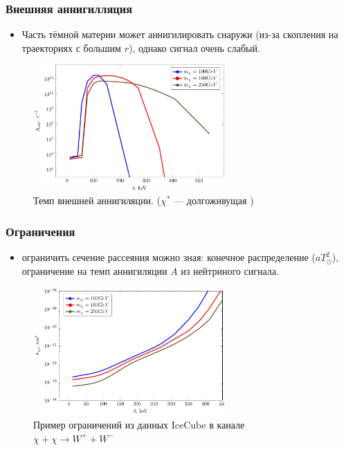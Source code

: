 \documentclass[
11pt,]{beamer}
\begin{document}
	\begin{frame}
		\frametitle{Внешняя аннигилляция}
		\begin{itemize}
	\item Часть тёмной материи может аннигилировать снаружи (из-за скопления на траекториях с большим $r$), однако сигнал очень слабый.
\end{itemize}

\begin{figure}[!h]
	\centering
	\includegraphics[width=0.65\textwidth]{images/Aout.png}
	\caption{Темп внешней аннигиляции. ($\chi^*$ --- долгоживущая )}
\end{figure}
	\end{frame}
	
	\begin{frame}
		\frametitle{Ограничения}
		\begin{itemize}
	\item ограничить сечение рассеяния можно зная: конечное распределение ($aT_{\odot}^2$), ограничение на темп аннигиляции  $A$ из нейтриного сигнала. 
\end{itemize}
\begin{figure}[!h]
	\centering
	\includegraphics[width=0.65\textwidth]{images/Constrains.png}
	\caption{Пример ограничений из данных IceCube в канале $\chi+\chi \to W^{+} + W^{-}$}
\end{figure}
	\end{frame}
	
\end{document}
